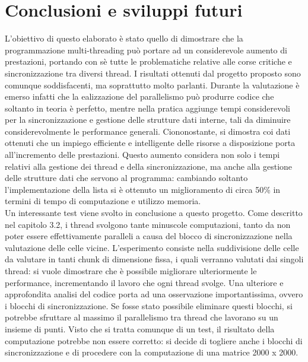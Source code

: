 \documentclass[12pt,a4paper,openright,oneside]{report}
\renewcommand{\chaptermark}[1]{\markboth{\thechapter.\ #1}{}}
\begin{document}
\chapter*{Conclusioni e sviluppi futuri}
\chaptermark{CONCLUSIONI}
L'obiettivo di questo elaborato è stato quello di dimostrare che la programmazione multi-threading può portare ad un considerevole
aumento di prestazioni, portando con sè tutte le problematiche relative alle corse critiche e sincronizzazione tra diversi thread.
I risultati ottenuti dal progetto proposto sono comunque soddisfacenti, ma soprattutto molto parlanti. Durante la valutazione è
emerso infatti che la ealizzazione del parallelismo può produrre codice che soltanto in teoria è perfetto, mentre nella pratica
aggiunge tempi considerevoli per la sincronizzazione e gestione delle strutture dati interne, tali da diminuire considerevolmente
le performance generali. Ciononostante, si dimostra coi dati ottenuti che un impiego efficiente e intelligente delle risorse a disposizione
porta all'incremento delle prestazioni. Questo aumento considera non solo i tempi relativi alla gestione dei thread e della sincronizzazione,
ma anche alla gestione delle strutture dati che servono al programma: cambiando soltanto l'implementazione della lista si è ottenuto
un miglioramento di circa 50\% in termini di tempo di computazione e utilizzo memoria.\\

Un interessante test viene svolto in conclusione a questo progetto. Come descritto nel capitolo 3.2, i thread svolgono tante minuscole
computazioni, tanto da non poter essere effettivamente paralleli a causa del blocco di sincronizzazione nella valutazione delle celle vicine. L'esperimento consiste nella suddivisione delle celle da valutare in tanti chunk di dimensione fissa, i quali verranno valutati 
dai singoli thread: si vuole dimostrare che è possibile migliorare ulteriormente le performance, incrementando il lavoro che ogni
thread svolge. Una ulteriore e approfondita analisi del codice porta ad una osservazione importantissima, ovvero i blocchi di sincronizzazione. Se fosse stato possibile eliminare questi blocchi, si potrebbe sfruttare al massimo il parallelismo tra thread che lavorano su un insieme di punti. Visto che si tratta comunque di un test, il risultato della computazione  potrebbe non essere corretto: si decide di togliere anche i blocchi di sincronizzazione e di procedere con la computazione di una matrice 2000 x 2000.
\end{document}
